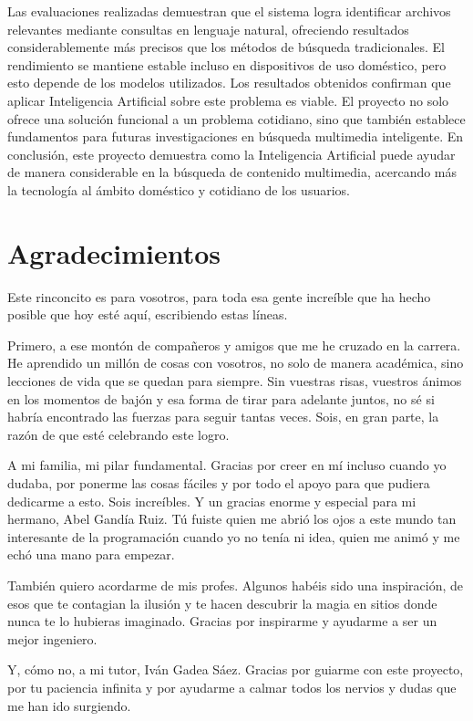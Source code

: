 Las evaluaciones realizadas demuestran que el sistema logra identificar archivos relevantes mediante consultas en lenguaje natural, ofreciendo resultados considerablemente más precisos que los métodos de búsqueda tradicionales. El rendimiento se mantiene estable incluso en dispositivos de uso doméstico, pero esto depende de los modelos utilizados.
Los resultados obtenidos confirman que aplicar Inteligencia Artificial sobre este problema es viable. El proyecto no solo ofrece una solución funcional a un problema cotidiano, sino que también establece fundamentos para futuras investigaciones en búsqueda multimedia inteligente.
En conclusión, este proyecto demuestra como la Inteligencia Artificial puede ayudar de manera considerable en la búsqueda de contenido multimedia, acercando más la tecnología al ámbito doméstico y cotidiano de los usuarios.

\cleardoublepage %
\chapter*{Agradecimientos}
\thispagestyle{empty}
Este rinconcito es para vosotros, para toda esa gente increíble que ha hecho posible que hoy esté aquí, escribiendo estas líneas.

Primero, a ese montón de compañeros y amigos que me he cruzado en la carrera. He aprendido un millón de cosas con vosotros, no solo de manera académica, sino lecciones de vida que se quedan para siempre. Sin vuestras risas, vuestros ánimos en los momentos de bajón y esa forma de tirar para adelante juntos, no sé si habría encontrado las fuerzas para seguir tantas veces. Sois, en gran parte, la razón de que esté celebrando este logro.

A mi familia, mi pilar fundamental. Gracias por creer en mí incluso cuando yo dudaba, por ponerme las cosas fáciles y por todo el apoyo para que pudiera dedicarme a esto. Sois increíbles. Y un gracias enorme y especial para mi hermano, Abel Gandía Ruiz. Tú fuiste quien me abrió los ojos a este mundo tan interesante de la programación cuando yo no tenía ni idea, quien me animó y me echó una mano para empezar.

También quiero acordarme de mis profes. Algunos habéis sido una inspiración, de esos que te contagian la ilusión y te hacen descubrir la magia en sitios donde nunca te lo hubieras imaginado. Gracias por inspirarme y ayudarme a ser un mejor ingeniero.

Y, cómo no, a mi tutor, Iván Gadea Sáez. Gracias por guiarme con este proyecto, por tu paciencia infinita y por ayudarme a calmar todos los nervios y dudas que me han ido surgiendo.

